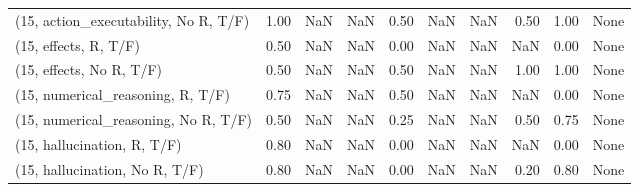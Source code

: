 \begin{table*}[h!]
\begin{adjustbox}{width=2\columnwidth,center}
\begin{tabular}{lrrr|rrr|rrr}
(15, action\_executability, No R, T/F) &                      1.00 &                   NaN &                       NaN &                          0.50 &                       NaN &                           NaN &                                   0.50 &                               1.00 &                                  None \\
(15, effects, R, T/F)                 &                      0.50 &                   NaN &                       NaN &                          0.00 &                       NaN &                           NaN &                                    NaN &                               0.00 &                                  None \\
(15, effects, No R, T/F)              &                      0.50 &                   NaN &                       NaN &                          0.50 &                       NaN &                           NaN &                                   1.00 &                               1.00 &                                  None \\
(15, numerical\_reasoning, R, T/F)     &                      0.75 &                   NaN &                       NaN &                          0.50 &                       NaN &                           NaN &                                    NaN &                               0.00 &                                  None \\
(15, numerical\_reasoning, No R, T/F)  &                      0.50 &                   NaN &                       NaN &                          0.25 &                       NaN &                           NaN &                                   0.50 &                               0.75 &                                  None \\
(15, hallucination, R, T/F)           &                      0.80 &                   NaN &                       NaN &                          0.00 &                       NaN &                           NaN &                                    NaN &                               0.00 &                                  None \\
(15, hallucination, No R, T/F)        &                      0.80 &                   NaN &                       NaN &                          0.00 &                       NaN &                           NaN &                                   0.20 &                               0.80 &                                  None \\

\end{tabular}
\end{adjustbox}
\end{table*}
